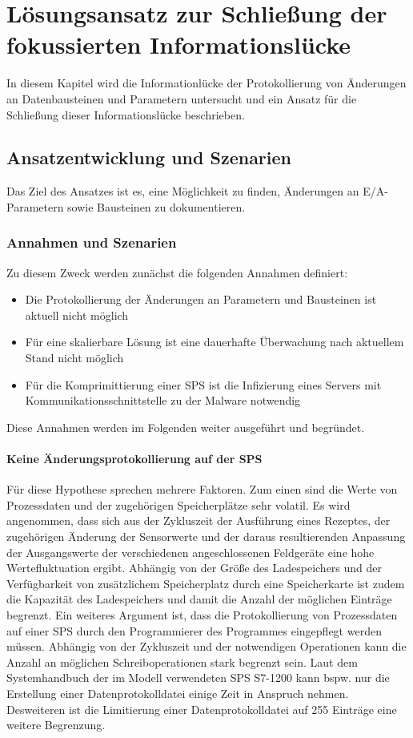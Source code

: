 \chapter{Lösungsansatz zur Schlie\ss ung der fokussierten Informationslücke}
In diesem Kapitel wird die Informationlücke der Protokollierung von Änderungen an Datenbausteinen und Parametern untersucht und ein Ansatz für die Schließung dieser Informationslücke beschrieben.

\section{Ansatzentwicklung und Szenarien}
Das Ziel des Ansatzes ist es, eine Möglichkeit zu finden, Änderungen an E/A-Parametern sowie Bausteinen zu dokumentieren. 

\subsection{Annahmen und Szenarien}
Zu diesem Zweck werden zunächst die folgenden Annahmen definiert:
\begin{itemize}
\item Die Protokollierung der Änderungen an Parametern und Bausteinen ist aktuell nicht möglich
\item Für eine skalierbare Lösung ist eine dauerhafte Überwachung nach aktuellem Stand nicht möglich
\item Für die Komprimittierung einer SPS ist die Infizierung eines Servers mit Kommunikationsschnittstelle zu der Malware notwendig
\end{itemize}

Diese Annahmen werden im Folgenden weiter ausgeführt und begründet.

\subsubsection{Keine Änderungsprotokollierung auf der SPS}
Für diese Hypothese sprechen mehrere Faktoren. Zum einen sind die Werte von Prozessdaten und der zugehörigen Speicherplätze sehr volatil. 
Es wird angenommen, dass sich aus der Zykluszeit der Ausführung eines Rezeptes, der zugehörigen Änderung der Sensorwerte und der daraus resultierenden Anpassung der Ausgangswerte der verschiedenen angeschlossenen Feldgeräte eine hohe Wertefluktuation ergibt. 
Abhängig von der Größe des Ladespeichers und der Verfügbarkeit von zusätzlichem Speicherplatz durch eine Speicherkarte ist zudem die Kapazität des Ladespeichers und damit die Anzahl der möglichen Einträge begrenzt. 
Ein weiteres Argument ist, dass die Protokollierung von Prozessdaten auf einer SPS durch den Programmierer des Programmes eingepflegt werden müssen. Abhängig von der Zykluszeit und der notwendigen Operationen kann die Anzahl an möglichen Schreiboperationen stark begrenzt sein. Laut dem Systemhandbuch der im Modell verwendeten SPS S7-1200 kann bspw. nur die Erstellung einer Datenprotokolldatei einige Zeit in Anspruch nehmen. Desweiteren ist die Limitierung einer Datenprotokolldatei auf 255 Einträge eine weitere Begrenzung.

